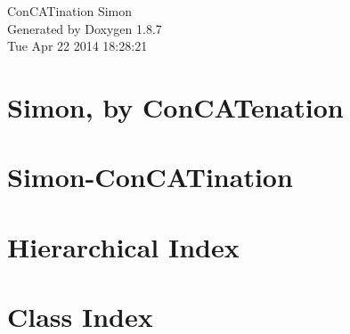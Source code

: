 \documentclass[twoside]{book}
\newcommand{\+}{\discretionary{\mbox{\scriptsize$\hookleftarrow$}}{}{}}
\newcommand{\clearemptydoublepage}{%
  \newpage{\pagestyle{empty}\cleardoublepage}%
}
\begin{document}
\hypersetup{pageanchor=false,
             bookmarks=true,
             bookmarksnumbered=true,
             pdfencoding=unicode
            }
\begin{titlepage}
\vspace*{7cm}
\begin{center}%
{\Large Con\+C\+A\+Tination Simon }\\
\vspace*{1cm}
{\large Generated by Doxygen 1.8.7}\\
\vspace*{0.5cm}
{\small Tue Apr 22 2014 18:28:21}\\
\end{center}
\end{titlepage}
\clearemptydoublepage
\tableofcontents
\clearemptydoublepage
{}
\hypersetup{pageanchor=true}

\chapter{Simon, by Con\+C\+A\+Tenation}
\label{index}\hypertarget{index}{}
\chapter{Simon-\/\+Con\+C\+A\+Tination}
\label{md__r_e_a_d_m_e}
\hypertarget{md__r_e_a_d_m_e}{}

\chapter{Hierarchical Index}

\chapter{Class Index}

\end{document}
